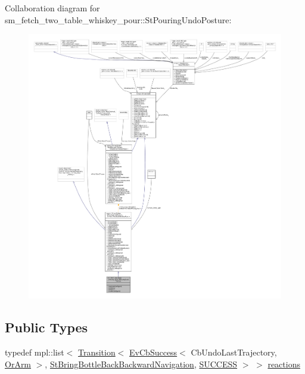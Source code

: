 Collaboration diagram for sm\+\_\+fetch\+\_\+two\+\_\+table\+\_\+whiskey\+\_\+pour\+:\+:St\+Pouring\+Undo\+Posture\+:
\nopagebreak
\begin{figure}[H]
\begin{center}
\leavevmode
\includegraphics[width=350pt]{structsm__fetch__two__table__whiskey__pour_1_1StPouringUndoPosture__coll__graph}
\end{center}
\end{figure}
\subsection*{Public Types}
\begin{DoxyCompactItemize}
\item 
typedef mpl\+::list$<$ \hyperlink{classsmacc_1_1Transition}{Transition}$<$ \hyperlink{structsmacc_1_1EvCbSuccess}{Ev\+Cb\+Success}$<$ Cb\+Undo\+Last\+Trajectory, \hyperlink{classsm__fetch__two__table__whiskey__pour_1_1OrArm}{Or\+Arm} $>$, \hyperlink{structsm__fetch__two__table__whiskey__pour_1_1StBringBottleBackBackwardNavigation}{St\+Bring\+Bottle\+Back\+Backward\+Navigation}, \hyperlink{structsmacc_1_1default__transition__tags_1_1SUCCESS}{S\+U\+C\+C\+E\+SS} $>$ $>$ \hyperlink{structsm__fetch__two__table__whiskey__pour_1_1StPouringUndoPosture_aed162ee53c7400df32cc8cea722d41a3}{reactions}
\end{DoxyCompactItemize}
